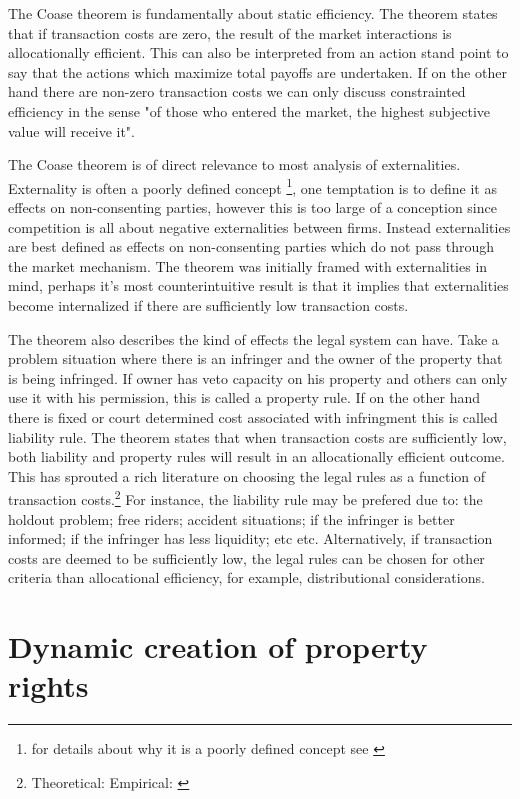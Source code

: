 \documentclass[12pt]{article}
\numberwithin{equation}{section}
\begin{document}
The Coase theorem is fundamentally about static efficiency. The theorem states that if transaction costs are zero, the result of the market interactions is allocationally efficient. This can also be interpreted from an action stand point to say that the actions which maximize total payoffs are undertaken. If on the other hand there are non-zero transaction costs we can only discuss constrainted efficiency in the sense "of those who entered the market, the highest subjective value will receive it". 

The Coase theorem is of direct relevance to most analysis of externalities. Externality is often a poorly defined concept \footnote{for details about why it is a poorly defined concept see \cite{Cheung1970}}, one temptation is to define it as effects on non-consenting parties, however this is too large of a conception since competition is all about negative externalities between firms. Instead externalities are best defined as effects on non-consenting parties which do not pass through the market mechanism. The theorem was initially framed with externalities in mind, perhaps it's most counterintuitive result is that it implies that externalities become internalized if there are sufficiently low transaction costs. 

The theorem also describes the kind of effects the legal system can have. Take a problem situation where there is an infringer and the owner of the property that is being infringed. If owner has veto capacity on his property and others can only use it with his permission, this is called a property rule. If on the other hand there is fixed or court determined cost associated with infringment this is called liability rule. The theorem states that when transaction costs are sufficiently low, both liability and property rules will result in an allocationally efficient outcome. This has sprouted a rich literature on choosing the legal rules as a function of transaction costs.\footnote{Theoretical: \cite{calabresi1972property} Empirical: \cite{kaplow1995property}} For instance, the liability rule may be prefered due to: the holdout problem; free riders; accident situations; if the infringer is better informed; if the infringer has less liquidity; etc etc. Alternatively, if transaction costs are deemed to be sufficiently low, the legal rules can be chosen for other criteria than allocational efficiency, for example, distributional considerations. 

\newpage

\section{Dynamic creation of property rights}
\end{document}
